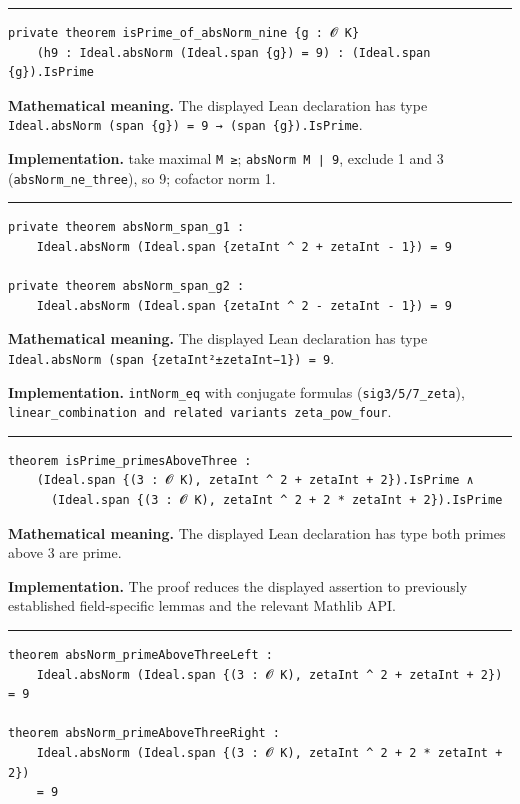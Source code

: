 \documentclass[UTF8,a4paper,11pt,fontset=fandol]{ctexart}
\theoremstyle{definition}
\newcommand{\statementsep}{\par\medskip\hrule\medskip}
\begin{document}
\statementsep
\begin{verbatim}
private theorem isPrime_of_absNorm_nine {g : 𝓞 K}
    (h9 : Ideal.absNorm (Ideal.span {g}) = 9) : (Ideal.span {g}).IsPrime
\end{verbatim}
\noindent\textbf{Mathematical meaning.} The displayed Lean declaration has type \texttt{Ideal.\allowbreak{}absNorm (span \{g\}) = 9 → (span \{g\}).\allowbreak{}IsPrime}.\par
\noindent\textbf{Implementation.} take maximal \texttt{M ≥}; \texttt{absNorm M ∣ 9}, exclude 1 and 3 (\texttt{absNorm\_\allowbreak{}ne\_\allowbreak{}three}), so 9; cofactor norm 1.\par
\statementsep
\begin{verbatim}
private theorem absNorm_span_g1 :
    Ideal.absNorm (Ideal.span {zetaInt ^ 2 + zetaInt - 1}) = 9

private theorem absNorm_span_g2 :
    Ideal.absNorm (Ideal.span {zetaInt ^ 2 - zetaInt - 1}) = 9
\end{verbatim}
\noindent\textbf{Mathematical meaning.} The displayed Lean declaration has type \texttt{Ideal.\allowbreak{}absNorm (span \{zetaInt²±zetaInt−1\}) = 9}.\par
\noindent\textbf{Implementation.} \texttt{intNorm\_\allowbreak{}eq} with conjugate formulas (\texttt{sig3/\allowbreak{}5/\allowbreak{}7\_\allowbreak{}zeta}), \texttt{linear\_\allowbreak{}combination and related variants zeta\_\allowbreak{}pow\_\allowbreak{}four}.\par
\statementsep
\begin{verbatim}
theorem isPrime_primesAboveThree :
    (Ideal.span {(3 : 𝓞 K), zetaInt ^ 2 + zetaInt + 2}).IsPrime ∧
      (Ideal.span {(3 : 𝓞 K), zetaInt ^ 2 + 2 * zetaInt + 2}).IsPrime
\end{verbatim}
\noindent\textbf{Mathematical meaning.} The displayed Lean declaration has type both primes above 3 are prime.\par
\noindent\textbf{Implementation.} The proof reduces the displayed assertion to previously established field-specific lemmas and the relevant Mathlib API.\par
\statementsep
\begin{verbatim}
theorem absNorm_primeAboveThreeLeft :
    Ideal.absNorm (Ideal.span {(3 : 𝓞 K), zetaInt ^ 2 + zetaInt + 2}) = 9

theorem absNorm_primeAboveThreeRight :
    Ideal.absNorm (Ideal.span {(3 : 𝓞 K), zetaInt ^ 2 + 2 * zetaInt + 2})
    = 9
\end{verbatim}
\end{document}
